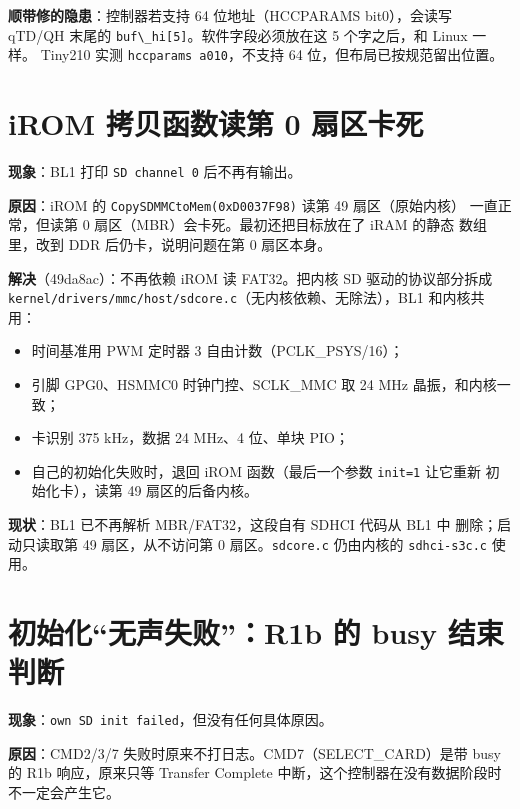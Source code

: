 \textbf{顺带修的隐患}：控制器若支持 64 位地址（HCCPARAMS bit0），会读写
qTD/QH 末尾的 \passthrough{\lstinline!buf\_hi[5]!}。软件字段必须放在这 5
个字之后，和 Linux 一样。 Tiny210 实测
\passthrough{\lstinline!hccparams a010!}，不支持 64
位，但布局已按规范留出位置。

\section{iROM 拷贝函数读第 0
扇区卡死}\label{irom-ux62f7ux8d1dux51fdux6570ux8bfbux7b2c-0-ux6247ux533aux5361ux6b7b}

\textbf{现象}：BL1 打印 \passthrough{\lstinline!SD channel 0!}
后不再有输出。

\textbf{原因}：iROM 的
\passthrough{\lstinline!CopySDMMCtoMem(0xD0037F98)!} 读第 49
扇区（原始内核） 一直正常，但读第 0
扇区（MBR）会卡死。最初还把目标放在了 iRAM 的静态 数组里，改到 DDR
后仍卡，说明问题在第 0 扇区本身。

\textbf{解决}（49da8ac）：不再依赖 iROM 读 FAT32。把内核 SD
驱动的协议部分拆成
\passthrough{\lstinline!kernel/drivers/mmc/host/sdcore.c!}（无内核依赖、无除法），BL1
和内核共用：

\begin{itemize}
\tightlist
\item
  时间基准用 PWM 定时器 3 自由计数（PCLK\_PSYS/16）；
\item
  引脚 GPG0、HSMMC0 时钟门控、SCLK\_MMC 取 24 MHz 晶振，和内核一致；
\item
  卡识别 375 kHz，数据 24 MHz、4 位、单块 PIO；
\item
  自己的初始化失败时，退回 iROM 函数（最后一个参数
  \passthrough{\lstinline!init=1!} 让它重新 初始化卡），读第 49
  扇区的后备内核。
\end{itemize}

\textbf{现状}：BL1 已不再解析 MBR/FAT32，这段自有 SDHCI 代码从 BL1 中
删除；启动只读取第 49 扇区，从不访问第 0 扇区。\passthrough{\lstinline!sdcore.c!}
仍由内核的 \passthrough{\lstinline!sdhci-s3c.c!} 使用。

\section{初始化``无声失败''：R1b 的 busy
结束判断}\label{ux521dux59cbux5316ux65e0ux58f0ux5931ux8d25r1b-ux7684-busy-ux7ed3ux675fux5224ux65ad}

\textbf{现象}：\passthrough{\lstinline!own SD init failed!}，但没有任何具体原因。

\textbf{原因}：CMD2/3/7 失败时原来不打日志。CMD7（SELECT\_CARD）是带
busy 的 R1b 响应，原来只等 Transfer Complete
中断，这个控制器在没有数据阶段时 不一定会产生它。

